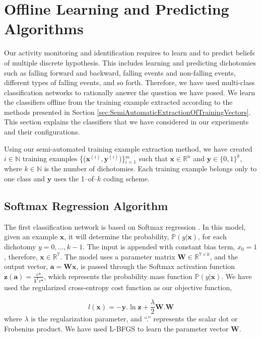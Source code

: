 \documentclass[]{IEEEtran}
\begin{document}
\section{Offline Learning and Predicting Algorithms}
\label{sec:OffLineLearning}

Our activity monitoring and identification requires to learn and to predict
beliefs of multiple discrete hypothesis. This includes learning and predicting
dichotomies such as falling forward and backward, falling events and
non-falling events, different types of falling events, and so forth.
Therefore, we have used multi-class classification networks to rationally
answer the question we have posed. We learn the classifiers offline from the
training example extracted according to the methods presented in Section
\ref{sec:SemiAutomaticExtractionOfTrainingVectors}. This section explains the
classifiers that we have considered in our experiments and their
configurations. 

Using our semi-automated training example extraction method, we have created $i \in 
\mathbb{N}$ 
training examples 
\{($\mathbf{x}^{(i)}, \mathbf{y}^{(i)}$)\}$_{i=1}^m$ such that $\mathbf{x} \in 
\mathbb{R}^{n}$ 
and 
$\mathbf{y} \in 
\{0,1\}^k$, where  $k \in 
\mathbb{N}$ is the number of dichotomies. Each training example belongs only to one class 
and $\mathbf{y}$ uses the 1--of--$k$ coding scheme.    

\subsection{Softmax Regression Algorithm}
\label{sec:SoftmaxRegrationAlgorthm}

The first classification network is based on Softmax regression
\cite{Bishop:2006:PRM:1162264}. In this model, given an example $\mathbf{x}$, it will
determine the probability, $\mathbb{P}(y | \mathbf{x})$, for each dichotomy
$y=0,\ldots,k-1$. The input is appended with constant bias term, $x_0 = 1$,
therefore, $\mathbf{x} \in \mathbb{R}^7$. The model uses a parameter matrix
$\mathbf{W} \in \mathbb{R}^{7 \times k}$, and the output vector, $\mathbf{a} =
\mathbf{Wx}$, is passed through the Softmax activation function $\mathbf{z(a)}
= \frac{e^{\mathbf{a}}}{\mathbf{1}^\mathtt{T} e^{\mathbf{a}}}$, which
represents the probability mass function $\mathbb{P}(y | \mathbf{x})$. We have
used the regularized cross-entropy cost function as our objective function, 

\begin{equation} 
l(\mathbf{x}) = -\mathbf{y}.\ln \mathbf{z} + \frac{\lambda}{2} \mathbf{W}.\mathbf{W}
\label{eq:objective-function}
\end{equation}
 where  $\lambda$ is the regularization parameter, and ``.'' represents the scalar dot  
or Frobenius product.
 We have used L-BFGS \cite{DBLP:conf/icml/LeNCLPN11} to learn the 
parameter vector $\mathbf{W}$.  
\end{document}
